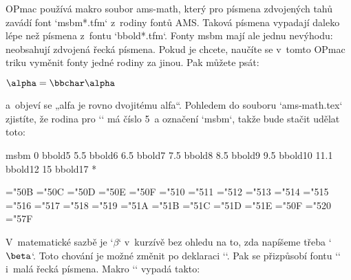  


OPmac používá makro soubor ams-math, který pro písmena zdvojených tahů zavádí font `msbm*.tfm` z~rodiny fontů AMS. Taková písmena vypadají daleko lépe než písmena z~fontu `bbold*.tfm`. Fonty msbm mají ale jednu nevýhodu: neobsahují zdvojená řecká písmena. Pokud je chcete, naučíte se v~tomto OPmac triku vyměnit fonty jedné rodiny za jinou. Pak můžete psát: 

\begtt
$\alpha = {\bbchar\alpha}$ 
\endtt


a~objeví se „alfa je rovno dvojitému alfa“. Pohledem do souboru `ams-math.tex` zjistíte, že rodina pro `\bbchar` má číslo 5~a označení `msbm`, takže bude stačit udělat toto: 

\begtt
\regtfm msbm 0 bbold5 5.5 bbold6 6.5 bbold7 7.5 bbold8 8.5 bbold9 
             9.5 bbold10 11.1 bbold12 15 bbold17 * %
 
\mathchardef\bbalpha="50B   \mathchardef\bbbeta="50C    \mathchardef\bbgamma="50D 
\mathchardef\bbdelta="50E   \mathchardef\bbepsilon="50F \mathchardef\bbzeta="510 
\mathchardef\bbeta="511     \mathchardef\bbtheta="512   \mathchardef\bbiota="513 
\mathchardef\bbkappa="514   \mathchardef\bblambda="515  \mathchardef\bbmu="516 
\mathchardef\bbnu="517      \mathchardef\bbxi="518      \mathchardef\bbpi="519 
\mathchardef\bbrho="51A     \mathchardef\bbsigma="51B   \mathchardef\bbtau="51C 
\mathchardef\bbupsilon="51D \mathchardef\bbphi="51E     \mathchardef\bbchi="50F 
\mathchardef\bbpsi="520     \mathchardef\bbomega="57F 
 
\addto\bbchar{\let\alpha\bbalpha \let\beta\bbbeta \let\gamma\bbgamma 
   \let\delta\bbdelda \let\epsilon\bbepsilon \let\zeta\bbzeta \let\theta\bbtheta 
   \let\iota\bbiota \let\kappa\bbkappa \let\lambda\bblambda \let\mu\bbmu 
   \let\nu\bbnu \let\xi\bbxi \let\pi\bbpi \let\rho\bbrho \let\sigma\bbsigma 
   \let\tau\bbtau \let\upsilon\bbupsilon \let\phi\bbphi \let\chi\bbchi 
   \let\psi\bbpsi \let\omega\bbomega 
} 
\endtt

 


V~matematické sazbě je `$\beta$` v~kurzívě bez ohledu na to, zda napíšeme třeba `$\rm\beta$`. Toto chování je možné změnit po deklaraci `\smartgreek`. Pak se přizpůsobí fontu `\rm` i~malá řecká písmena. Makro `\smartgreek` vypadá takto: 

